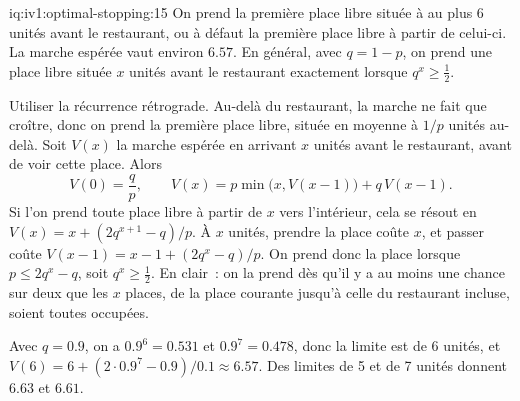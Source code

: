 \begin{solution}{iq:iv1:optimal-stopping:15}
On prend la première place libre située à au plus 6 unités avant le restaurant, ou à défaut la première place libre à partir de celui-ci. La marche espérée vaut environ $6.57$. En général, avec $q = 1 - p$, on prend une place libre située $x$ unités avant le restaurant exactement lorsque $q^x \ge \tfrac12$.

Utiliser la récurrence rétrograde. Au-delà du restaurant, la marche ne fait que croître, donc on prend la première place libre, située en moyenne à $1/p$ unités au-delà. Soit $V(x)$ la marche espérée en arrivant $x$ unités avant le restaurant, avant de voir cette place. Alors
\[
V(0) = \frac{q}{p}, \qquad V(x) = p\min\bigl(x, V(x - 1)\bigr) + q\,V(x - 1).
\]
Si l'on prend toute place libre à partir de $x$ vers l'intérieur, cela se résout en $V(x) = x + (2q^{x + 1} - q)/p$. À $x$ unités, prendre la place coûte $x$, et passer coûte $V(x - 1) = x - 1 + (2q^x - q)/p$. On prend donc la place lorsque $p \le 2q^x - q$, soit $q^x \ge \tfrac12$. En clair~: on la prend dès qu'il y a au moins une chance sur deux que les $x$ places, de la place courante jusqu'à celle du restaurant incluse, soient toutes occupées.

Avec $q = 0.9$, on a $0.9^6 = 0.531$ et $0.9^7 = 0.478$, donc la limite est de 6 unités, et $V(6) = 6 + (2 \cdot 0.9^7 - 0.9)/0.1 \approx 6.57$. Des limites de 5 et de 7 unités donnent $6.63$ et $6.61$.

\end{solution}

